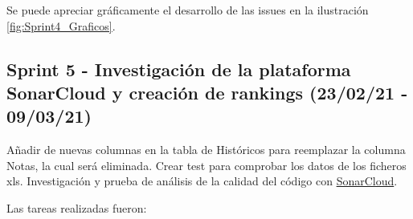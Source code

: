 Se puede apreciar gráficamente el desarrollo de las issues en la ilustración \ref{fig:Sprint4_Graficos}.


\subsection{Sprint 5 - Investigación de la plataforma SonarCloud y creación de rankings (23/02/21 - 09/03/21)}
Añadir de nuevas columnas en la tabla de Históricos para reemplazar la columna Notas, la cual será eliminada. Crear test para comprobar los datos de los ficheros xls. Investigación y prueba de análisis de la calidad del código con \href{https://sonarcloud.io/}{SonarCloud}.

Las tareas realizadas fueron:

